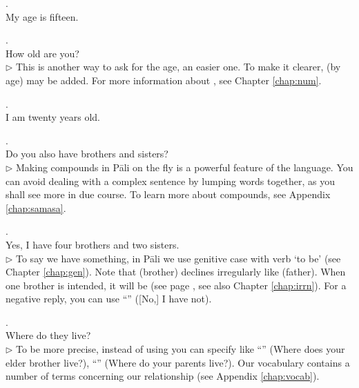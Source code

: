 \medskip
{}. \\
\hspace*{12mm}My age is fifteen.

\medskip
{}. \\
\hspace*{12mm}How old are you?\\
{\small $\triangleright$ This is another way to ask for the age, an easier one. To make it clearer,  (by age) may be added. For more information about , see Chapter \ref{chap:num}.}

\medskip
{}. \\
\hspace*{12mm}I am twenty years old.

\medskip
{}. \\
\hspace*{12mm}Do you also have brothers and sisters?\\
{\small $\triangleright$ Making compounds in P\=ali on the fly is a powerful feature of the language. You can avoid dealing with a complex sentence by lumping words together, as you shall see more in due course. To learn more about compounds, see Appendix \ref{chap:samasa}.}

\medskip
{}. \\
\hspace*{12mm}Yes, I have four brothers and two sisters.\\
{\small $\triangleright$ To say we have something, in P\=ali we use genitive case with verb `to be' (see Chapter \ref{chap:gen}). Note that  (brother) declines irregularly like  (father). When one brother is intended, it will be  (see page \pageref{decl:pitu}, see also Chapter \ref{chap:irrn}). For a negative reply, you can use ``'' ([No,] I have not).}

\medskip
{}. \\
\hspace*{12mm}Where do they live?\\
{\small $\triangleright$ To be more precise, instead of using  you can specify like ``'' (Where does your elder brother live?), ``'' (Where do your parents live?). Our vocabulary contains a number of terms concerning our relationship (see Appendix \ref{chap:vocab}).}

